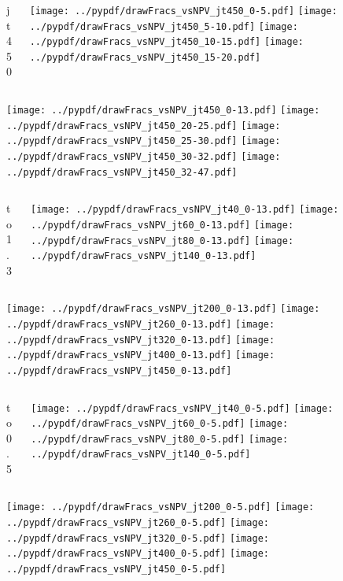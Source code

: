 \documentclass[aspectratio=169]{beamer}
\begin{document}
\begin{figure}[p]
\flushleft
\begin{columns}[T]
\begin{column}{.2\linewidth}
\centering
jt450
\end{column}
\begin{column}{.8\linewidth}
\texttt{[image: ../pypdf/drawFracs\_vsNPV\_jt450\_0-5.pdf]}
\texttt{[image: ../pypdf/drawFracs\_vsNPV\_jt450\_5-10.pdf]}
\texttt{[image: ../pypdf/drawFracs\_vsNPV\_jt450\_10-15.pdf]}
\texttt{[image: ../pypdf/drawFracs\_vsNPV\_jt450\_15-20.pdf]}
\end{column}
\end{columns}
\texttt{[image: ../pypdf/drawFracs\_vsNPV\_jt450\_0-13.pdf]}
\texttt{[image: ../pypdf/drawFracs\_vsNPV\_jt450\_20-25.pdf]}
\texttt{[image: ../pypdf/drawFracs\_vsNPV\_jt450\_25-30.pdf]}
\texttt{[image: ../pypdf/drawFracs\_vsNPV\_jt450\_30-32.pdf]}
\texttt{[image: ../pypdf/drawFracs\_vsNPV\_jt450\_32-47.pdf]}
\end{figure}

\begin{figure}[p]
\flushleft
\begin{columns}[T]
\begin{column}{.2\linewidth}
 to 1.3
\end{column}
\begin{column}{.8\linewidth}
\texttt{[image: ../pypdf/drawFracs\_vsNPV\_jt40\_0-13.pdf]}
\texttt{[image: ../pypdf/drawFracs\_vsNPV\_jt60\_0-13.pdf]}
\texttt{[image: ../pypdf/drawFracs\_vsNPV\_jt80\_0-13.pdf]}
\texttt{[image: ../pypdf/drawFracs\_vsNPV\_jt140\_0-13.pdf]}
\end{column}
\end{columns}
\texttt{[image: ../pypdf/drawFracs\_vsNPV\_jt200\_0-13.pdf]}
\texttt{[image: ../pypdf/drawFracs\_vsNPV\_jt260\_0-13.pdf]}
\texttt{[image: ../pypdf/drawFracs\_vsNPV\_jt320\_0-13.pdf]}
\texttt{[image: ../pypdf/drawFracs\_vsNPV\_jt400\_0-13.pdf]}
\texttt{[image: ../pypdf/drawFracs\_vsNPV\_jt450\_0-13.pdf]}
\end{figure}

\begin{figure}[p]
\flushleft
\begin{columns}[T]
\begin{column}{.2\linewidth}
 to 0.5
\end{column}
\begin{column}{.8\linewidth}
\texttt{[image: ../pypdf/drawFracs\_vsNPV\_jt40\_0-5.pdf]}
\texttt{[image: ../pypdf/drawFracs\_vsNPV\_jt60\_0-5.pdf]}
\texttt{[image: ../pypdf/drawFracs\_vsNPV\_jt80\_0-5.pdf]}
\texttt{[image: ../pypdf/drawFracs\_vsNPV\_jt140\_0-5.pdf]}
\end{column}
\end{columns}
\texttt{[image: ../pypdf/drawFracs\_vsNPV\_jt200\_0-5.pdf]}
\texttt{[image: ../pypdf/drawFracs\_vsNPV\_jt260\_0-5.pdf]}
\texttt{[image: ../pypdf/drawFracs\_vsNPV\_jt320\_0-5.pdf]}
\texttt{[image: ../pypdf/drawFracs\_vsNPV\_jt400\_0-5.pdf]}
\texttt{[image: ../pypdf/drawFracs\_vsNPV\_jt450\_0-5.pdf]}
\end{figure}
\end{document}
